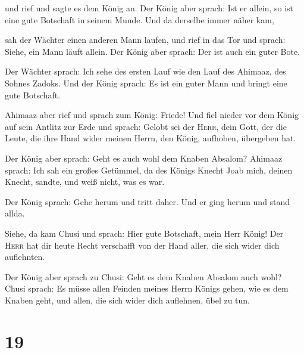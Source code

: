  und rief und sagte es dem König an. Der König aber
sprach: Ist er allein, so ist eine gute Botschaft in seinem Munde. Und
da derselbe immer näher kam,

 sah der Wächter einen anderen Mann laufen, und rief in
das Tor und sprach: Siehe, ein Mann läuft allein. Der König aber sprach:
Der ist auch ein guter Bote.

 Der Wächter sprach: Ich sehe des ersten Lauf wie den
Lauf des Ahimaaz, des Sohnes Zadoks. Und der König sprach: Es ist ein
guter Mann und bringt eine gute Botschaft.

 Ahimaaz aber rief und sprach zum König: Friede! Und fiel
nieder vor dem König auf sein Antlitz zur Erde und sprach: Gelobt sei
der \textsc{Herr}, dein Gott, der die Leute, die ihre Hand wider meinen
Herrn, den König, aufhoben, übergeben hat.

 Der König aber sprach: Geht es auch wohl dem Knaben
Absalom? Ahimaaz sprach: Ich sah ein großes Getümmel, da des Königs
Knecht Joab mich, deinen Knecht, sandte, und weiß nicht, was es war.

 Der König sprach: Gehe herum und tritt daher. Und er
ging herum und stand allda.

 Siehe, da kam Chusi und sprach: Hier gute Botschaft,
mein Herr König! Der \textsc{Herr} hat dir heute Recht verschafft von
der Hand aller, die sich wider dich auflehnten.

 Der König aber sprach zu Chusi: Geht es dem Knaben
Absalom auch wohl? Chusi sprach: Es müsse allen Feinden meines Herrn
Königs gehen, wie es dem Knaben geht, und allen, die sich wider dich
auflehnen, übel zu tun.

\hypertarget{section-18}{%
\section{19}\label{section-18}}

